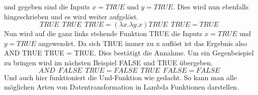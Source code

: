 und gegeben sind die Inputs $x = TRUE$ und $y = TRUE$. Dies wird nun ebenfalls hingeschrieben und es wird weiter aufgelöst. 
\begin{equation}
TRUE\:\:TRUE\:\:TRUE = (\lambda x. \lambda y. x) TRUE\:\:TRUE = TRUE
\end{equation}
Nun wird auf die ganz links stehende Funktion TRUE die Inputs $x = TRUE$ und $y = TRUE$ angewendet. Da sich TRUE immer zu x auflöst ist das Ergebnis also AND TRUE TRUE = TRUE. Dies bestätigt die Annahme. Um ein Gegenbeispiel zu bringen wird im nächsten Beispiel FALSE und TRUE übergeben.
\begin{equation}
AND\:\:FALSE\:\:TRUE = FALSE\:\:TRUE\:\:FALSE = FALSE
\end{equation}
Und auch hier funktioniert die Und-Funktion wie gedacht. So kann man alle möglichen Arten von Datentransformation in Lambda Funktionen darstellen. 
\cite{lambdacalculus}

